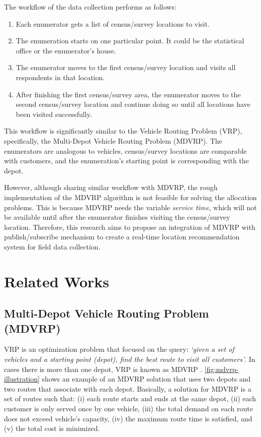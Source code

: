 \documentclass[conference]{IEEEtran}
\begin{document}
The workflow of the data collection performs as follows: 
\begin{enumerate}
	\item Each enumerator gets a list of census/survey locations to visit. 
	\item The enumeration starts on one particular point. It could be the statistical office or the enumerator's house. 
	\item The enumerator moves to the first census/survey location and visits all respondents in that location. 
	\item After finishing the first census/survey area, the enumerator moves to the second census/survey location and continue doing so until all locations have been visited successfully.
\end{enumerate}
This workflow is significantly similar to the Vehicle Routing Problem (VRP), specifically, the Multi-Depot Vehicle Routing Problem (MDVRP). The enumerators are analogous to vehicles, census/survey locations are comparable with customers, and the enumeration's starting point is corresponding with the depot. 

However, although sharing similar workflow with MDVRP, the rough implementation of the MDVRP algorithm is not feasible for solving the allocation problems. This is because MDVRP needs the variable \textit{service time}, which will not be available until after the enumerator finishes visiting the census/survey location. Therefore, this research aims to propose an integration of MDVRP with publish/subscribe mechanism to create a real-time location recommendation system for field data collection. 


\section{Related Works}
\label{sec:related-works}
\subsection{Multi-Depot Vehicle Routing Problem (MDVRP)}
\label{ssec:mdvrp}
VRP is an optimization problem that focused on the query: \textit{`given a set of vehicles and a starting point (depot), find the best route to visit all customers'}. In cases there is more than one depot, VRP is known as MDVRP \cite{montoya-torres_literature_2015}. \autoref{fig:mdvrp-illustration} shows an example of an MDVRP solution that uses two depots and two routes that associate with each depot. Basically, a solution for MDVRP is a set of routes such that: (i) each route starts and ends at the same depot, (ii) each customer is only served once by one vehicle, (iii) the total demand on each route does not exceed vehicle's capacity, (iv) the maximum route time is satisfied, and (v) the total cost is minimized.
\end{document}
